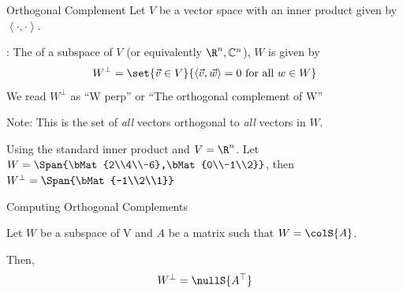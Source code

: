 \documentclass[xcoler=dvipsnames, aspectratio=169]{beamer}
\date{Orthogonality}
\newcommand{\C}{\mathbb{C}}
\newcommand{\ip}[2]{\left\langle #1,#2\right\rangle}
\begin{document}
    \begin{frame}{Orthogonal Complement}
        \footnotesize
        Let $V$ be a vector space with an inner product given by $\ip{\cdot}{\cdot}$.
        \begin{defn}
            : The  of a subspace of
            $V$ (or equivalently $\R^n,\C^n$), $W$ is given by
            \[
                W^\perp = \set{\vec{v}\in V}{\ip{\vec{v}}{\vec{w}} = 0\textnormal{ for all }w\in W}
            \]\pause
            We read $W^\perp$ as ``W perp'' or ``The orthogonal complement of W''
        \end{defn}\pause
        Note: This is the set of \emph{all} vectors orthogonal to \emph{all} vectors in $W$.
        \begin{example}Using the standard inner product and $V=\R^n$.
        Let $W=\Span{\bMat{2\\4\\-6},\bMat{0\\-1\\2}}$, then $W^\perp=\Span{\bMat{-1\\2\\1}}$
        \end{example}
    \end{frame}
    \begin{frame}{Computing Orthogonal Complements}
        \begin{theorem}
            Let $W$ be a subspace of V and $A$ be a matrix such that $W = \colS{A}$.

            Then, $$W^\perp = \nullS{A^\top}$$
        \end{theorem}
    \end{frame}
\end{document}
